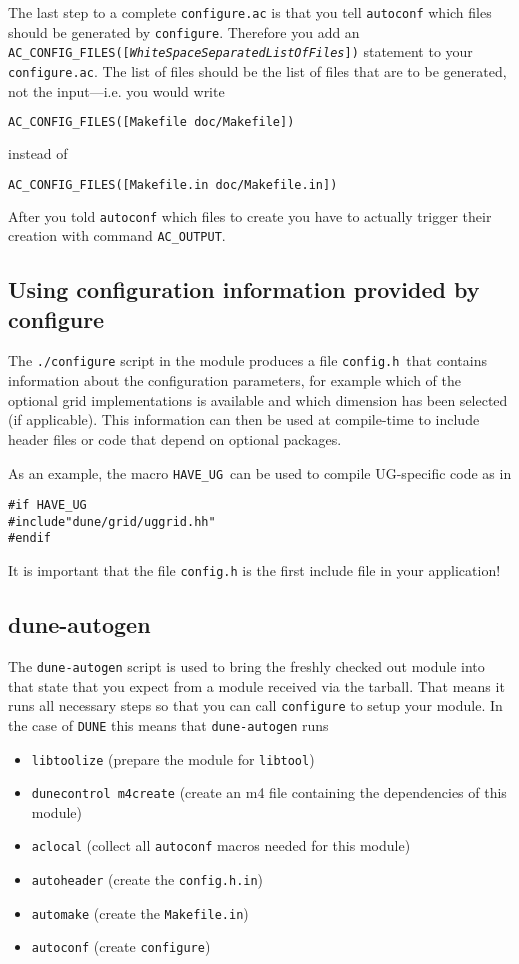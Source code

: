 \documentclass[11pt,a4paper,headinclude,footinclude,DIV16,normalheadings]{scrartcl}
\newcommand{\dune}{\texttt{DUNE}\xspace}
\newcommand{\autoconf}{\texttt{autoconf}\xspace}
\newcommand{\autogen}{\texttt{dune-autogen}\xspace}
\newcommand{\libtool}{\texttt{libtool}\xspace}
\newcommand{\configure}{\texttt{configure}\xspace}
\newcommand{\configureac}{\texttt{configure.ac}\xspace}
\newcommand{\makefilein}{\texttt{Makefile.in}\xspace}
\begin{document}
The last step to a complete \configureac is that you tell \autoconf
which files should be generated by \configure. Therefore you add an
\texttt{AC\_CONFIG\_FILES([\textit{WhiteSpaceSeparatedListOfFiles}])}
statement to your \configureac. The list of files should be the list
of files that are to be generated, not the input---i.e. you would
write
\begin{lstlisting}[language=make]
AC_CONFIG_FILES([Makefile doc/Makefile])
\end{lstlisting}
instead of
\begin{lstlisting}[language=make]
AC_CONFIG_FILES([Makefile.in doc/Makefile.in])
\end{lstlisting}
After you told \autoconf which files to create you have to actually
trigger their creation with command \texttt{AC\_OUTPUT}.

\subsection{Using configuration information provided by configure}

The \lstinline!./configure! script in the module produces a file
\lstinline!config.h!\ that contains information about the configuration
parameters, for example which of the optional grid implementations is
available and which dimension has been selected (if applicable). This
information can then be used at compile-time to include header files
or code that depend on optional packages.

As an example, the macro \lstinline!HAVE_UG!\ can be used to compile
UG-specific code as in
\begin{lstlisting}[basicstyle=\ttfamily\scriptsize]
#if HAVE_UG
#include"dune/grid/uggrid.hh"
#endif
\end{lstlisting}

It is important that the file \lstinline!config.h! is the first
include file in your application!




\subsection{dune-autogen}
\label{autogen}

The \autogen script is used to bring the freshly checked out module
into that state that you expect from a module received via the
tarball. That means it runs all necessary steps so that you can call
\configure to setup your module. In the case of \dune this means that
\autogen runs
\begin{itemize}
\item \texttt{libtoolize} (prepare the module for \libtool)
\item \texttt{dunecontrol m4create} (create an m4 file containing the
  dependencies of this module)
\item \texttt{aclocal} (collect all \autoconf macros needed for this module)
\item \texttt{autoheader} (create the \texttt{config.h.in})
\item \texttt{automake} (create the \makefilein)
\item \texttt{autoconf} (create \configure)
\end{itemize}
\end{document}
